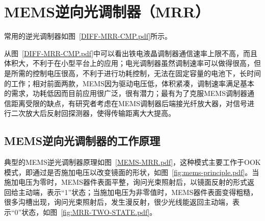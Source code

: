 \chapter{MEMS逆向光调制器（MRR）}
常用的逆光调制器如图~\ref{DIFF-MRR-CMP.pdf}所示。

从图~\ref{DIFF-MRR-CMP.pdf}中可以看出铁电液晶调制器通信速率上限不高，而且体积大，不利于在小型平台上的应用；电光调制器虽然调制速率可以做得很高，但是所需的控制电压很高，不利于进行功耗控制，无法在固定容量的电池下，长时间的工作；相对前面两款，MEMS因为驱动电压低，体积紧凑，调制速率满足基本的需求，功耗低因而目前应用很广泛，很有潜力；最有为了克服MEMS调制器通信距离受限的缺点，有研究者考虑在MEMS调制器后端接光纤放大器，对信号进行二次放大后反射回探测器，使得传输距离大大提高。



\section{MEMS逆向光调制器的工作原理}
典型的MEMS逆光调制器原理如图~\ref{MEMS-MRR.pdf}，这种模式主要工作于OOK模式，即通过是否施加电压以改变镜面的形状，如图~\ref{fig:mems-principle.pdf}。当施加电压为零时，MEMS器件表面平整，询问光束照射后，以镜面反射的形式返回给主动端，表示“1”状态；当施加电压为非零值时，MEMS器件表面变得粗糙，很多沟槽出现，询问光束照射后，发生漫反射，很少光线能返回主动端，表示“0”状态，如图~\ref{fig:MRR-TWO-STATE.pdf}。

